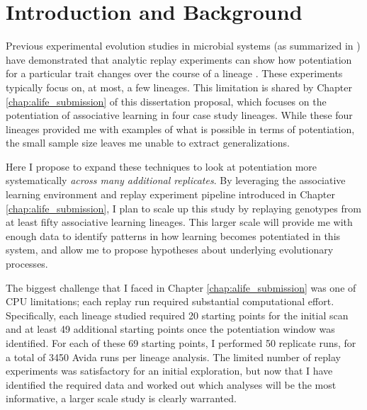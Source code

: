 \section{Introduction and Background}

Previous experimental evolution studies in microbial systems (as summarized in \cite{blountContingencyDeterminismEvolution2018}) have demonstrated that analytic replay experiments can show how potentiation for a particular trait changes over the course of a lineage \citep{blountHistoricalContingencyEvolution2008, meyerRepeatabilityContingencyEvolution2012, jochumsenEvolutionAntimicrobialPeptide2016a, woodsSecondorderSelectionEvolvability2011}.
These experiments typically focus on, at most, a few lineages. 
This limitation is shared by Chapter \ref{chap:alife_submission} of this dissertation proposal, which focuses on the potentiation of associative learning in four case study lineages.
While these four lineages provided me with examples of what is possible in terms of potentiation, the small sample size leaves me unable to extract generalizations.

Here I propose to expand these techniques to look at potentiation more systematically  \textit{across many additional replicates}. %
By leveraging the associative learning environment and replay experiment pipeline introduced in Chapter \ref{chap:alife_submission}, I plan to scale up this study by replaying genotypes from at least fifty associative learning lineages.
This larger scale will provide me with enough data to identify patterns in how learning becomes potentiated in this system, and allow me to propose hypotheses about underlying evolutionary processes. 

The biggest challenge that I faced in Chapter \ref{chap:alife_submission} was one of CPU limitations; each replay run required substantial computational effort.
Specifically, each lineage studied required 20 starting points for the initial scan and at least 49 additional starting points once the potentiation window was identified.  
For each of these 69 starting points, I performed 50 replicate runs, for a total of 3450 Avida runs per lineage analysis.
The limited number of replay experiments was satisfactory for an initial exploration, but now that I have identified the required data and worked out which analyses will be the most informative, a larger scale study is clearly warranted.

